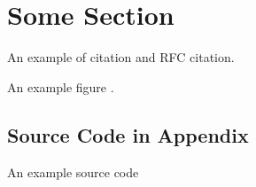 
\section{Some Section}

An example of citation\cite{SomeCitation} and RFC citation\cite{rfc2616}.

An example figure .


\subsection{Source Code in Appendix}

An example source code 

